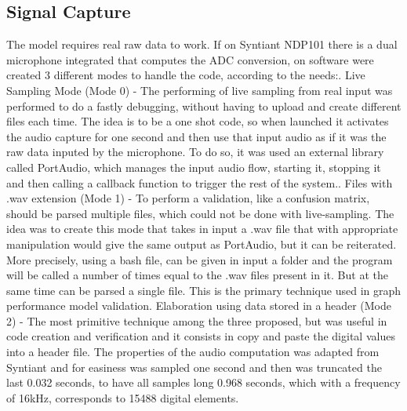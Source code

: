 \subsection{Signal Capture}
\label{subsec:signal}
The model requires real raw data to work. If on Syntiant NDP101 there is a dual microphone integrated that computes the ADC conversion, on software were created 3 different modes to handle the code, according to the needs:\newline{}. Live Sampling Mode (Mode 0) - The performing of live sampling from real input was performed to do a fastly debugging, without having to upload and create different files each time. The idea is to be a one shot code, so when launched it activates the audio capture for one second and then use that input audio as if it was the raw data inputed by the microphone. To do so, it was used an external library called PortAudio\cite{portaudio}, which manages the input audio flow, starting it, stopping it and then calling a callback function to trigger the rest of the system.. Files with .wav extension (Mode 1) - To perform a validation, like a confusion matrix, should be parsed multiple files, which could not be done with live-sampling. The idea was to create this mode that takes in input a .wav file that with appropriate manipulation would give the same output as PortAudio, but it can be reiterated. More precisely, using a bash file, can be given in input a folder and the program will be called a number of times equal to the .wav files present in it. But at the same time can be parsed a single file. This is the primary technique used in graph performance model validation. Elaboration using data stored in a header (Mode 2) - The most primitive technique among the three proposed, but was useful in code creation and verification and it consists in copy and paste the digital values into a header file.\newline\newline
The properties of the audio computation was adapted from Syntiant and for easiness was sampled one second and then was truncated the last 0.032 seconds, to have all samples long 0.968 seconds, which with a frequency of 16kHz, corresponds to 15488 digital elements.

